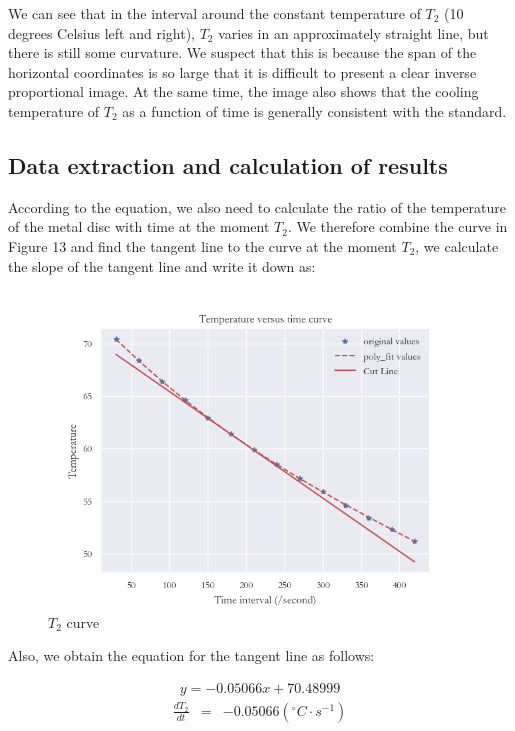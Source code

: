 \documentclass[UTF8]{article}
\begin{document}
	We can see that in the interval around the constant temperature of $T_{2}$ (10 degrees Celsius left and right), $T_{2}$ varies in an approximately straight line, but there is still some curvature. We suspect that this is because the span of the horizontal coordinates is so large that it is difficult to present a clear inverse proportional image. At the same time, the image also shows that the cooling temperature of $T_{2}$ as a function of time is generally consistent with the standard.

    \subsection{Data extraction and calculation of results}
    According to the equation, we also need to calculate the ratio of the temperature of the metal disc with time at the moment $T_{2}$. We therefore combine the curve in Figure 13 and find the tangent line to the curve at the moment $T_{2}$, we calculate the slope of the tangent line and write it down as:
     \begin{figure}[H]
    	\centering
    	\includegraphics[clip,scale=0.75]{fig/fig14.png}
    	\caption{$T_{2}$ curve}
    	\label{figure.13}
    \end{figure}

     Also, we obtain the equation for the tangent line as follows:
     
     \begin{eqnarray}y  =  -0.05066x+70.48999\end{eqnarray}
     \begin{eqnarray}\frac{dT_{2} }{dt} & = & -0.05066\left ( ^{\circ}C\cdot s^{-1}   \right ) \end{eqnarray}
     
\end{document}
